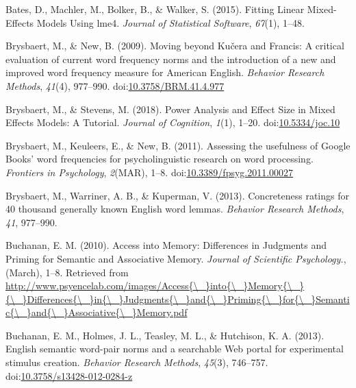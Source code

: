 \documentclass[english,man]{apa6}
\theoremstyle{definition}
\theoremstyle{definition}
\theoremstyle{definition}
\theoremstyle{remark}
\begin{document}
\hypertarget{ref-Bates2015}{}
Bates, D., Machler, M., Bolker, B., \& Walker, S. (2015). Fitting Linear
Mixed-Effects Models Using lme4. \emph{Journal of Statistical Software},
\emph{67}(1), 1--48.

\hypertarget{ref-Brysbaert2009}{}
Brysbaert, M., \& New, B. (2009). Moving beyond Kučera and Francis: A
critical evaluation of current word frequency norms and the introduction
of a new and improved word frequency measure for American English.
\emph{Behavior Research Methods}, \emph{41}(4), 977--990.
doi:\href{https://doi.org/10.3758/BRM.41.4.977}{10.3758/BRM.41.4.977}

\hypertarget{ref-Brysbaert2018}{}
Brysbaert, M., \& Stevens, M. (2018). Power Analysis and Effect Size in
Mixed Effects Models: A Tutorial. \emph{Journal of Cognition},
\emph{1}(1), 1--20.
doi:\href{https://doi.org/10.5334/joc.10}{10.5334/joc.10}

\hypertarget{ref-Brysbaert2011}{}
Brysbaert, M., Keuleers, E., \& New, B. (2011). Assessing the usefulness
of Google Books' word frequencies for psycholinguistic research on word
processing. \emph{Frontiers in Psychology}, \emph{2}(MAR), 1--8.
doi:\href{https://doi.org/10.3389/fpsyg.2011.00027}{10.3389/fpsyg.2011.00027}

\hypertarget{ref-Brysbaert2013}{}
Brysbaert, M., Warriner, A. B., \& Kuperman, V. (2013). Concreteness
ratings for 40 thousand generally known English word lemmas.
\emph{Behavior Research Methods}, \emph{41}, 977--990.

\hypertarget{ref-Buchanan2010}{}
Buchanan, E. M. (2010). Access into Memory: Differences in Judgments and
Priming for Semantic and Associative Memory. \emph{Journal of Scientific
Psychology.}, (March), 1--8. Retrieved from
\href{http://www.psyencelab.com/images/Access\%7B/_\%7Dinto\%7B/_\%7DMemory\%7B/_\%7D\%7B/_\%7DDifferences\%7B/_\%7Din\%7B/_\%7DJudgments\%7B/_\%7Dand\%7B/_\%7DPriming\%7B/_\%7Dfor\%7B/_\%7DSemantic\%7B/_\%7Dand\%7B/_\%7DAssociative\%7B/_\%7DMemory.pdf}{http://www.psyencelab.com/images/Access\{\textbackslash{}\_\}into\{\textbackslash{}\_\}Memory\{\textbackslash{}\_\}\{\textbackslash{}\_\}Differences\{\textbackslash{}\_\}in\{\textbackslash{}\_\}Judgments\{\textbackslash{}\_\}and\{\textbackslash{}\_\}Priming\{\textbackslash{}\_\}for\{\textbackslash{}\_\}Semantic\{\textbackslash{}\_\}and\{\textbackslash{}\_\}Associative\{\textbackslash{}\_\}Memory.pdf}

\hypertarget{ref-Buchanan2013}{}
Buchanan, E. M., Holmes, J. L., Teasley, M. L., \& Hutchison, K. A.
(2013). English semantic word-pair norms and a searchable Web portal for
experimental stimulus creation. \emph{Behavior Research Methods},
\emph{45}(3), 746--757.
doi:\href{https://doi.org/10.3758/s13428-012-0284-z}{10.3758/s13428-012-0284-z}
\end{document}

